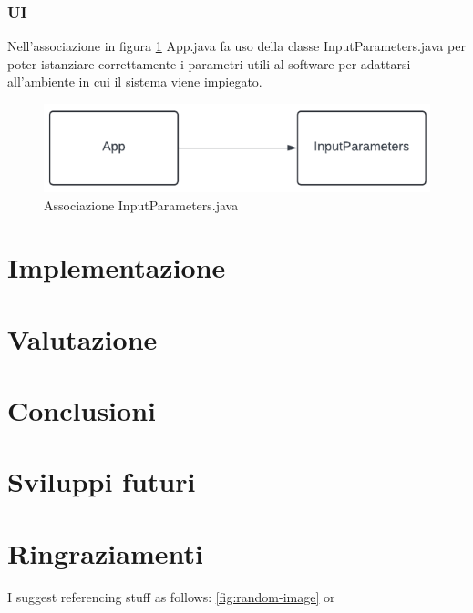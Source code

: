 \documentclass[12pt,a4paper,openright,twoside]{book}
\begin{document}
\subsection{UI}
Nell'associazione in figura \ref{fig:UI} App.java fa uso della classe InputParameters.java per poter istanziare correttamente i parametri utili al software per adattarsi all'ambiente in cui il sistema viene impiegato.
\begin{figure}
	\centering
	\includegraphics[width=0.5\linewidth]{./figures/UML/UI.png}
	\caption{Associazione InputParameters.java}
	\label{fig:UI}
\end{figure}


\chapter{Implementazione}


\chapter{Valutazione}

\chapter{Conclusioni}

\chapter{Sviluppi futuri}

\chapter{Ringraziamenti}

I suggest referencing stuff as follows: \cref{fig:random-image} or 
\end{document}
